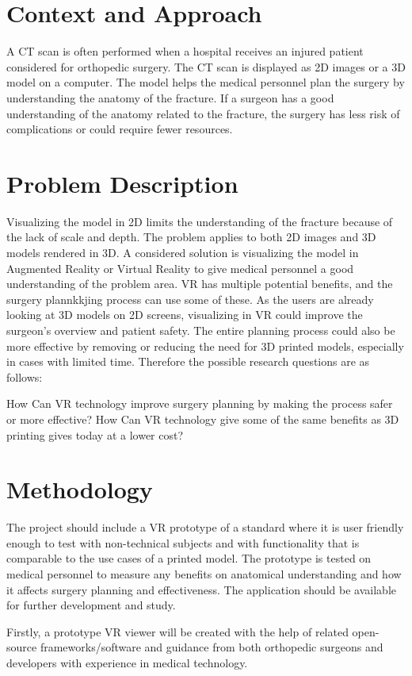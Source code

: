 \documentclass[a4paper]{report}
\begin{document}
\section{Context and Approach}
A CT scan is often performed when a hospital receives an injured patient considered for orthopedic surgery. The CT scan is displayed as 2D images or a 3D model on a computer. The model helps the medical personnel plan the surgery by understanding the anatomy of the fracture.
If a surgeon has a good understanding of the anatomy related to the fracture,
the surgery has less risk of complications or could require fewer resources.
\section{Problem Description}
Visualizing the model in 2D limits the understanding of the fracture because of the lack of scale and depth. The problem applies to both 2D images and 3D models rendered in 3D.
A considered solution is visualizing the model in Augmented Reality or Virtual Reality to give medical personnel a good understanding of the problem area.
VR has multiple potential benefits, and the surgery plannkkjing process can use some of these. As the users are already looking at 3D models on 2D screens, visualizing in VR could improve the surgeon's overview and patient safety. The entire planning process could also be more effective by removing or reducing the need for 3D printed models, especially in cases with limited time. Therefore the possible research questions are as follows:

How Can VR technology improve surgery planning by making the process safer or more effective?
How Can VR technology give some of the same benefits as 3D printing gives today at a lower cost?

\section{Methodology}

The project should include a VR prototype of a standard where it is
user friendly enough to test with non-technical subjects and with functionality
that is comparable to the use cases of a printed model.
The prototype is tested on medical personnel to measure any benefits on anatomical understanding and how it affects surgery planning and effectiveness.
The application should be available for further development and study.

Firstly, a prototype VR viewer will be created with the help of related
open-source frameworks/software and guidance from both orthopedic surgeons and
developers with experience in medical technology.
\end{document}
